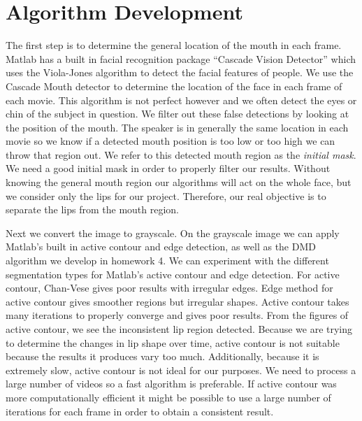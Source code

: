\documentclass{article}
\begin{document}
\section{Algorithm Development}

The first step is to determine the general location of the mouth in each frame. Matlab has a built in facial recognition package ``Cascade Vision Detector'' which uses the Viola-Jones algorithm to detect the facial features of people. We use the Cascade Mouth detector to determine the location of the face in each frame of each movie. This algorithm is not perfect however and we often detect the eyes or chin of the subject in question. We filter out these false detections by looking at the position of the mouth. The speaker is in generally the same location in each movie so we know if a detected mouth position is too low or too high we can throw that region out. We refer to this detected mouth region as the \textit{initial mask}. We need a good initial mask in order to properly filter our results. Without knowing the general mouth region our algorithms will act on the whole face, but we consider only the lips for our project. Therefore, our real objective is to separate the lips from the mouth region.\par
Next we convert the image to grayscale. On the grayscale image we can apply Matlab's built in active contour and edge detection, as well as the DMD algorithm we develop in homework 4. We can experiment with the different segmentation types for Matlab's active contour and edge detection. For active contour, Chan-Vese gives poor results with irregular edges. Edge method for active contour gives smoother regions but irregular shapes. Active contour takes many iterations to properly converge and gives poor results. From the figures of active contour, we see the inconsistent lip region detected. Because we are trying to determine the changes in lip shape over time, active contour is not suitable because the results it produces vary too much. Additionally, because it is extremely slow, active contour is not ideal for our purposes. We need to process a large number of videos so a fast algorithm is preferable. If active contour was more computationally efficient it might be possible to use a large number of iterations for each frame in order to obtain a consistent result.  \par
\end{document}
